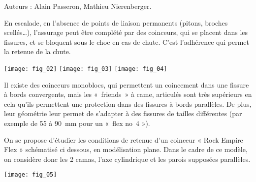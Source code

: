 Auteurs : Alain Passeron, Mathieu Nierenberger. 


En escalade, en l’absence de points de liaison permanents (pitons, broches scellés…), l’assurage peut être complété par des coinceurs, qui se placent dans les fissures, et se bloquent sous le choc en cas de chute. C’est l’adhérence qui permet la retenue de la chute.
\begin{center}
\texttt{[image: fig\_02]}
\texttt{[image: fig\_03]}
\texttt{[image: fig\_04]}
\end{center}
Il existe des coinceurs monoblocs, qui permettent un coincement dans une fissure à bords convergents, mais les 
«~friends~» à came, articulés sont très supérieurs en cela qu’ils permettent une protection dans des fissures à bords parallèles. De plus, leur géométrie leur permet de s’adapter à des fissures de tailles différentes (par exemple de 55 à \SI{90}{mm} pour un «~flex no~4 »).

On se propose d’étudier les conditions de retenue d’un coinceur « Rock Empire Flex » schématisé ci dessous, en modélisation plane. Dans le cadre de ce modèle, on considère donc les 2 camas, l'axe cylindrique et les parois supposées parallèles. 


\begin{center}
\texttt{[image: fig\_05]}
\end{center}

\ifprof
\begin{corrige}~\\
\end{corrige}
\else
\fi


\ifprof
\begin{corrige}~\\
\end{corrige}
\else
\fi

\ifprof
\begin{corrige}~\\
\end{corrige}
\else
\fi

\ifprof
\begin{corrige}~\\
\end{corrige}
\else
\fi


